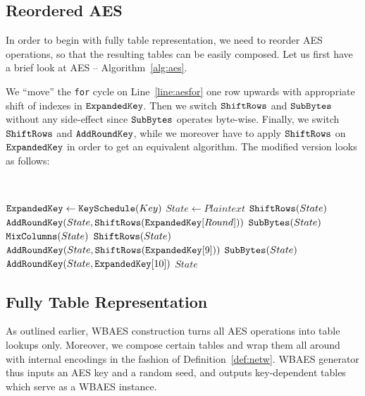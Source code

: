 
\subsection{Reordered AES}

In order to begin with fully table representation, we need to reorder AES operations, so that the resulting tables can be easily composed. Let us first have a brief look at AES -- Algorithm~\ref{alg:aes}.

We ``move'' the {\tt for} cycle on Line~\ref{line:aesfor} one row upwards with appropriate shift of indexes in $\texttt{ExpandedKey}$. Then we switch $\texttt{ShiftRows}$ and $\texttt{SubBytes}$ without any side-effect since $\texttt{SubBytes}$ operates byte-wise. Finally, we switch $\texttt{ShiftRows}$ and $\texttt{AddRoundKey}$, while we moreover have to apply $\texttt{ShiftRows}$ on $\texttt{ExpandedKey}$ in order to get an equivalent algorithm. The modified version looks as follows:
\begin{alg}
\label{alg:reordaes}
	~
	\begin{algorithmic}[1]
			\State $\texttt{ExpandedKey} \gets \texttt{KeySchedule}(Key)$
			\State $State \gets Plaintext$
				\State $\texttt{ShiftRows}(State)$
				\State $\texttt{AddRoundKey}(State, \texttt{ShiftRows}(\texttt{ExpandedKey}[Round]))$
				\State $\texttt{SubBytes}(State)$
				\State $\texttt{MixColumns}(State)$
			\EndFor
			\State $\texttt{ShiftRows}(State)$
			\State $\texttt{AddRoundKey}(State, \texttt{ShiftRows}(\texttt{ExpandedKey}[9]))$
			\State $\texttt{SubBytes}(State)$
			\State $\texttt{AddRoundKey}(State, \texttt{ExpandedKey}[10])$
			\State\Return $State$
		\EndFunction
	\end{algorithmic}
\end{alg}



\subsection{Fully Table Representation}

As outlined earlier, WBAES construction turns all AES operations into table lookups only. Moreover, we compose certain tables and wrap them all around with internal encodings in the fashion of Definition~\ref{def:netw}. WBAES generator thus inputs an AES key and a random seed, and outputs key-dependent tables which serve as a WBAES instance.

